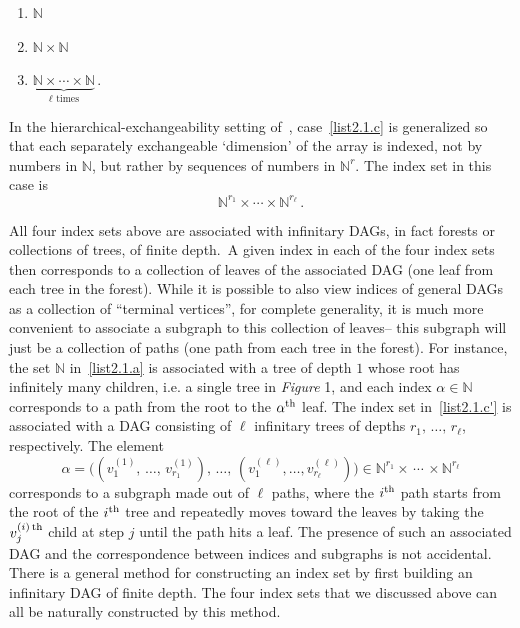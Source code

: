 \documentclass[AHL,Unicode,longabstracts,published]{cedram}
\newcommand*\N{\mathbb{N}}
\newcommand*{\alphenumi}{\renewcommand*{\theenumi}{\alph{enumi}}}
\newcommand*\N{\mathbb{N}}
\begin{document}
\begin{enumerate}\alphenumi
\item \label{list2.1.a}$\N$ 
\item \label{list2.1.b}$\N\times\N$ 
\item \label{list2.1.c}$\underbrace{\N\times\cdots\times\N}_{\ell \text{ times}}\,$.
\end{enumerate}
In the hierarchical-exchangeability setting of~\cite{austin:panchenko:2014}, case~\eqref{list2.1.c} is generalized so that each separately exchangeable `dimension' of the array is indexed, not by numbers in $\N$, but rather by sequences of numbers in $\N^r$. The index set in this case is
\begin{equation*}
\tag{$c'$} \N^{r_1}\times\cdots\times\N^{r_\ell}\,\label{list2.1.c'}.
\end{equation*}

All four index sets above are associated with infinitary DAGs, in fact forests or collections of trees, of finite depth.~A given index in each of the four index sets then corresponds to a collection of leaves of the associated DAG (one leaf from each tree in the forest). While it is possible to also view indices of general DAGs as a collection of ``terminal vertices'', for complete generality, it is much more convenient to associate a subgraph to this collection of leaves-- this subgraph will just be a collection of paths (one path from each tree in the forest). For instance, the set $\N$ in~\eqref{list2.1.a} is associated with a tree of depth $1$ whose root has infinitely many children, i.e. a single tree in \emph{Figure} 1, and each index $\alpha\in\N$ corresponds to a path from the root to the $\alpha^{\rm th}$ leaf. The index set in~\eqref{list2.1.c'} is associated with a DAG consisting of $\ell$ infinitary trees of depths $r_1,\,\ldots,\,r_\ell$, respectively. The element
\[
\alpha = \Bigg(\left(v^{(1)}_1,\,\ldots,\,v^{(1)}_{r_1}\right),\,\ldots,\,\left(v^{(\ell)}_1,\ldots,v^{(\ell)}_{r_\ell}\right)\Bigg) \in \N^{r_1}\times\,\cdots\,\times\N^{r_\ell}
\]
corresponds to a subgraph made out of $\ell$ paths, where the $i^{\rm th}$ path starts from the root of the $i^{\rm th}$ tree and repeatedly moves toward the leaves by taking the $v^{(i)\,\rm th}_j$ child at step $j$ until the path hits a leaf.
%
The presence of such an associated DAG and the correspondence between indices and subgraphs is not accidental. There is a general method for constructing an index set by first building an infinitary DAG of finite depth. The four index sets that we discussed above can all be naturally constructed by this method.
\end{document}
